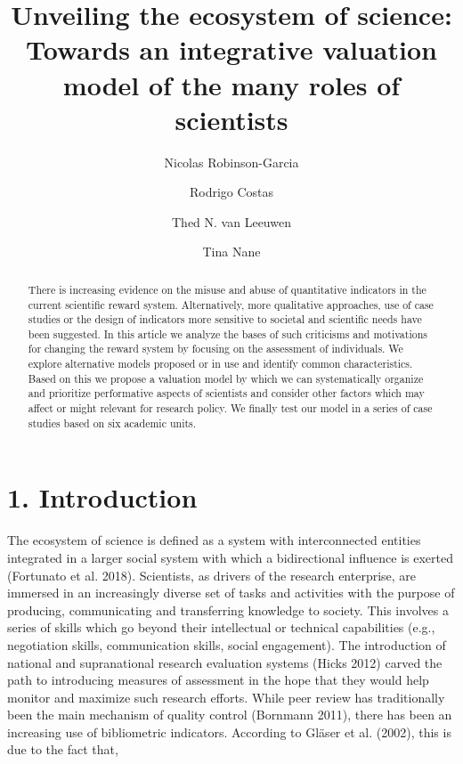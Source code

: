 \documentclass[]{elsarticle} %
\begin{document}
\begin{frontmatter}

  \title{Unveiling the ecosystem of science: Towards an integrative valuation
model of the many roles of scientists}
    \author[a]{Nicolas Robinson-Garcia}
    \author[b]{Rodrigo Costas}
  
  
    \author[b]{Thed N. van Leeuwen}
  
  
    \author[a]{Tina Nane}
  
  
      \address[a]{Applied Mathematics (DIAM), TU Delft, Delft, Netherlands}
    \address[b]{CWTS, Leiden University, Leiden, Netherlands}
  
  \begin{abstract}
  There is increasing evidence on the misuse and abuse of quantitative
  indicators in the current scientific reward system. Alternatively, more
  qualitative approaches, use of case studies or the design of indicators
  more sensitive to societal and scientific needs have been suggested. In
  this article we analyze the bases of such criticisms and motivations for
  changing the reward system by focusing on the assessment of individuals.
  We explore alternative models proposed or in use and identify common
  characteristics. Based on this we propose a valuation model by which we
  can systematically organize and prioritize performative aspects of
  scientists and consider other factors which may affect or might relevant
  for research policy. We finally test our model in a series of case
  studies based on six academic units.
  \end{abstract}
  
 \end{frontmatter}

\hypertarget{introduction}{%
\section{1. Introduction}\label{introduction}}

The ecosystem of science is defined as a system with interconnected
entities integrated in a larger social system with which a bidirectional
influence is exerted (Fortunato et al. 2018). Scientists, as drivers of
the research enterprise, are immersed in an increasingly diverse set of
tasks and activities with the purpose of producing, communicating and
transferring knowledge to society. This involves a series of skills
which go beyond their intellectual or technical capabilities (e.g.,
negotiation skills, communication skills, social engagement). The
introduction of national and supranational research evaluation systems
(Hicks 2012) carved the path to introducing measures of assessment in
the hope that they would help monitor and maximize such research
efforts. While peer review has traditionally been the main mechanism of
quality control (Bornmann 2011), there has been an increasing use of
bibliometric indicators. According to Gläser et al. (2002), this is due
to the fact that,
\end{document}
